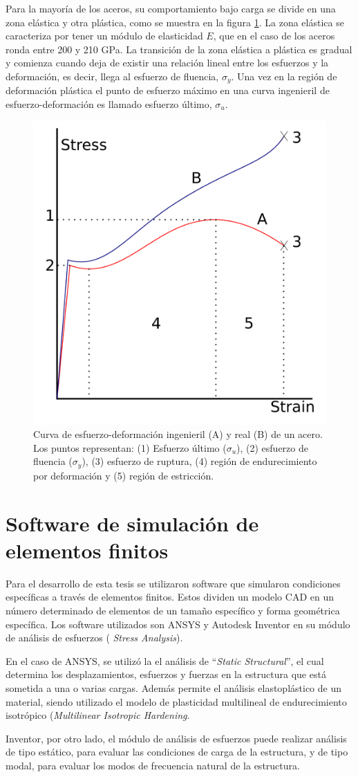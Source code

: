 Para la mayoría de los aceros, su comportamiento bajo carga se divide en una zona elástica y otra plástica, como se muestra en la figura \ref{fig:esf-def_curve}. La zona elástica se caracteriza por tener un módulo de elasticidad $E$, que en el caso de los aceros ronda entre 200 y 210 GPa. La transición de la zona elástica a plástica es gradual y comienza cuando deja de existir una relación lineal entre los esfuerzos y la deformación, es decir, llega al esfuerzo de fluencia, $\sigma_y$. Una vez en la región de deformación plástica el punto de esfuerzo máximo en una curva ingenieril de esfuerzo-deformación es llamado esfuerzo último, $\sigma_u$.

\begin{figure}[h!]
\centering
\includegraphics[width=0.6\linewidth]{Imagenes/strain-stress_curve.png}
\caption{Curva de esfuerzo-deformación ingenieril (A) y real (B) de un acero. Los puntos representan: (1) Esfuerzo último ($\sigma_u$), (2) esfuerzo de fluencia ($\sigma_y$), (3) esfuerzo de ruptura, (4) región de endurecimiento por deformación y (5) región de estricción. \cite{richfield}}
\label{fig:esf-def_curve}
\end{figure}


\section{Software de simulación de elementos finitos}
Para el desarrollo de esta tesis se utilizaron software que simularon condiciones específicas a través de elementos finitos. Estos dividen un modelo CAD en un número determinado de elementos de un tamaño específico y forma geométrica específica. Los software utilizados son ANSYS y Autodesk Inventor en su módulo de análisis de esfuerzos ( \textit{Stress Analysis}). 

En el caso de ANSYS, se utilizó la el análisis de ``\textit{Static Structural}'', el cual determina los desplazamientos, esfuerzos y fuerzas en la estructura que está sometida a una o varias cargas. Además permite el análisis elastoplástico de un material, siendo utilizado el modelo de plasticidad multilineal de endurecimiento isotrópico (\textit{Multilinear Isotropic Hardening}. 

Inventor, por otro lado, el módulo de análisis de esfuerzos puede realizar análisis de tipo estático, para evaluar las condiciones de carga de la estructura, y de tipo modal, para evaluar los modos de frecuencia natural de la estructura.


